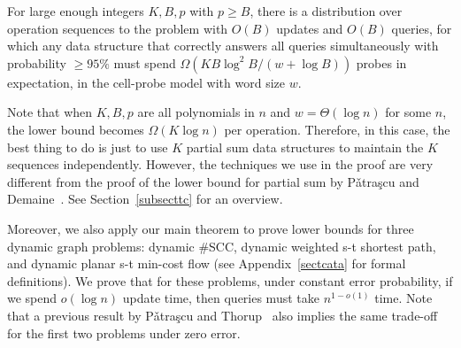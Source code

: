 \documentclass[11pt]{article}
\begin{document}
\begin{theorem}\label{thmbps}
For large enough integers $K,B,p$ with $p\geq B$, there is a distribution over operation sequences to the \bps{} problem with $O(B)$ updates and $O(B)$ queries, for which any data structure that correctly answers all queries simultaneously with probability $\geq 95\%$ must spend $\Omega(KB\log^2 B/(w+\log B))$ probes in expectation, in the cell-probe model with word size $w$.
\end{theorem}

Note that when $K,B,p$ are all polynomials in $n$ and $w=\Theta(\log n)$ for some $n$, the lower bound becomes $\Omega(K\log n)$ per operation. Therefore, in this case, the best thing to do is just to use $K$ partial sum data structures to maintain the $K$ sequences independently. However, the techniques we use in the proof are very different from the proof of the lower bound for partial sum by P\v{a}tra\c{s}cu and Demaine~\cite{PD04a}. See Section~\ref{subsecttc} for an overview. 

Moreover, we also apply our main theorem to prove lower bounds for three dynamic graph problems: dynamic \#SCC, dynamic weighted s-t shortest path, and dynamic planar s-t min-cost flow (see Appendix~\ref{sectcata} for formal definitions). We prove that for these problems, under constant error probability, if we spend $o(\log n)$ update time, then queries must take $n^{1-o(1)}$ time. Note that a previous result by P\v{a}tra\c{s}cu and Thorup~\cite{PT11} also implies the same trade-off for the first two problems under zero error. 

\end{document}
